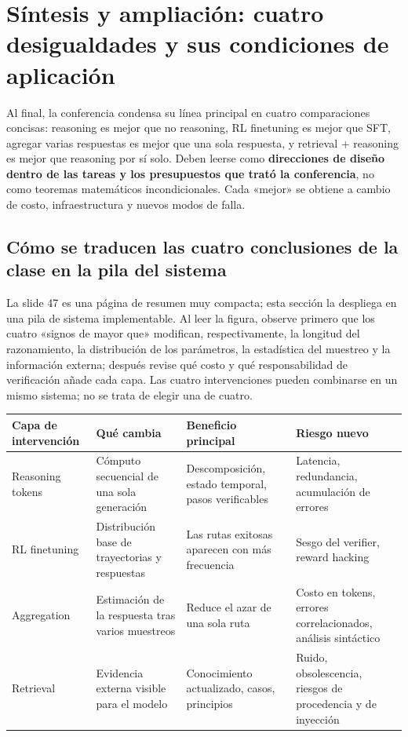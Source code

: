 \section{Síntesis y ampliación: cuatro desigualdades y sus condiciones de aplicación}

Al final, la conferencia condensa su línea principal en cuatro comparaciones concisas: reasoning es mejor que no reasoning, RL finetuning es mejor que SFT, agregar varias respuestas es mejor que una sola respuesta, y retrieval + reasoning es mejor que reasoning por sí solo. Deben leerse como \textbf{direcciones de diseño dentro de las tareas y los presupuestos que trató la conferencia}, no como teoremas matemáticos incondicionales. Cada «mejor» se obtiene a cambio de costo, infraestructura y nuevos modos de falla.

\subsection{Cómo se traducen las cuatro conclusiones de la clase en la pila del sistema}

La slide 47 es una página de resumen muy compacta; esta sección la despliega en una pila de sistema implementable. Al leer la figura, observe primero que los cuatro «signos de mayor que» modifican, respectivamente, la longitud del razonamiento, la distribución de los parámetros, la estadística del muestreo y la información externa; después revise qué costo y qué responsabilidad de verificación añade cada capa. Las cuatro intervenciones pueden combinarse en un mismo sistema; no se trata de elegir una de cuatro.


\begin{center}
\begin{tabularx}{0.97\textwidth}{p{}p{}X X}
\toprule
Capa de intervención & Qué cambia & Beneficio principal & Riesgo nuevo \\
\midrule
Reasoning tokens & Cómputo secuencial de una sola generación & Descomposición, estado temporal, pasos verificables & Latencia, redundancia, acumulación de errores \\
RL finetuning & Distribución base de trayectorias y respuestas & Las rutas exitosas aparecen con más frecuencia & Sesgo del verifier, reward hacking \\
Aggregation & Estimación de la respuesta tras varios muestreos & Reduce el azar de una sola ruta & Costo en tokens, errores correlacionados, análisis sintáctico \\
Retrieval & Evidencia externa visible para el modelo & Conocimiento actualizado, casos, principios & Ruido, obsolescencia, riesgos de procedencia y de inyección \\
\bottomrule
\end{tabularx}
\end{center}

